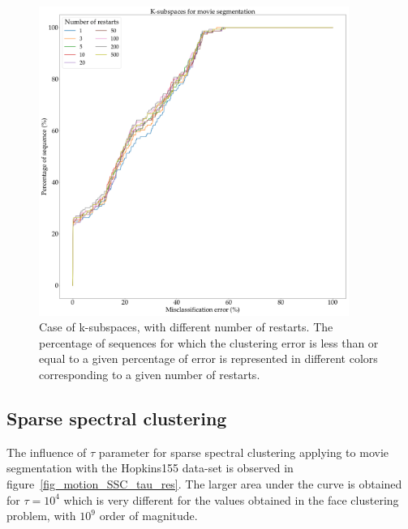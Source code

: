 \documentclass[12pt,a4paper,onecolumn]{article}
\begin{document}
\begin{figure}[H]
	\centering
	\includegraphics[width = 0.9\textwidth]{k_sub}
	\caption{Case of k-subspaces, with different number of restarts. The percentage of sequences for which the clustering error is less than or equal to a given percentage of error is represented in different colors corresponding to a given number of restarts.}
	\label{fig_motion_ksub_res}
\end{figure}


\subsection{Sparse spectral clustering}
The influence of \(\tau\) parameter for sparse spectral clustering applying to movie segmentation with the Hopkins155 data-set is observed in figure~\ref{fig_motion_SSC_tau_res}. The larger area under the curve is obtained for \(\tau = 10^4\) which is very different for the values obtained in the face clustering problem, with \(10^9\) order of magnitude.
\end{document}
